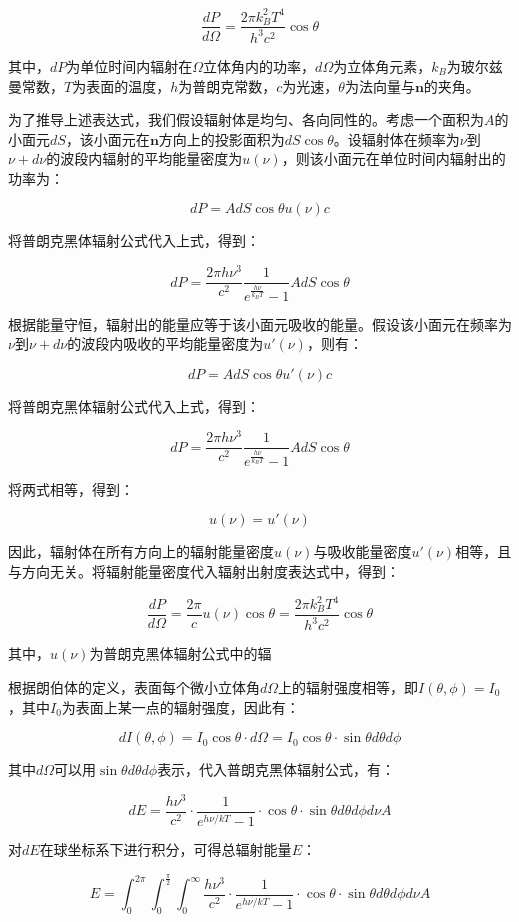 \documentclass[12pt, a4paper, oneside]{article}
\begin{document}
\begin{spacing}{2.0}
$$ \frac{dP}{d\Omega} = \frac{2\pi k_B^2 T^4}{h^3c^2}\cos\theta $$

其中，$dP$为单位时间内辐射在$\Omega$立体角内的功率，$d\Omega$为立体角元素，$k_B$为玻尔兹曼常数，$T$为表面的温度，$h$为普朗克常数，$c$为光速，$\theta$为法向量与$\mathbf{n}$的夹角。

为了推导上述表达式，我们假设辐射体是均匀、各向同性的。考虑一个面积为$A$的小面元$dS$，该小面元在$\mathbf{n}$方向上的投影面积为$dS\cos\theta$。设辐射体在频率为$\nu$到$\nu+d\nu$的波段内辐射的平均能量密度为$u(\nu)$，则该小面元在单位时间内辐射出的功率为：

$$ dP = A dS\cos\theta u(\nu) c $$

将普朗克黑体辐射公式代入上式，得到：

$$ dP = \frac{2\pi h\nu^3}{c^2}\frac{1}{e^{\frac{h\nu}{k_BT}}-1}A dS\cos\theta $$

根据能量守恒，辐射出的能量应等于该小面元吸收的能量。假设该小面元在频率为$\nu$到$\nu+d\nu$的波段内吸收的平均能量密度为$u'(\nu)$，则有：

$$ dP = A dS\cos\theta u'(\nu) c $$

将普朗克黑体辐射公式代入上式，得到：

$$ dP = \frac{2\pi h\nu^3}{c^2}\frac{1}{e^{\frac{h\nu}{k_BT}}-1}A dS\cos\theta $$

将两式相等，得到：

$$ u(\nu) = u'(\nu) $$

因此，辐射体在所有方向上的辐射能量密度$u(\nu)$与吸收能量密度$u'(\nu)$相等，且与方向无关。将辐射能量密度代入辐射出射度表达式中，得到：

$$ \frac{dP}{d\Omega} = \frac{2\pi}{c}u(\nu)\cos\theta = \frac{2\pi k_B^2 T^4}{h^3c^2}\cos\theta $$

其中，$u(\nu)$为普朗克黑体辐射公式中的辐

根据朗伯体的定义，表面每个微小立体角$d\Omega$上的辐射强度相等，即$I(\theta,\phi)=I_0$，其中$I_0$为表面上某一点的辐射强度，因此有：

$$dI(\theta,\phi)=I_0 \cos\theta \cdot d\Omega=I_0 \cos\theta \cdot \sin\theta d\theta d\phi$$

其中$d\Omega$可以用$\sin\theta d\theta d\phi$表示，代入普朗克黑体辐射公式，有：

$$dE=\frac{h\nu^3}{c^2} \cdot \frac{1}{e^{h\nu/kT}-1} \cdot \cos\theta \cdot \sin\theta d\theta d\phi d\nu A$$

对$dE$在球坐标系下进行积分，可得总辐射能量$E$：

$$E=\int_0^{2\pi}\int_0^{\frac{\pi}{2}}\int_0^{\infty}\frac{h\nu^3}{c^2} \cdot \frac{1}{e^{h\nu/kT}-1} \cdot \cos\theta \cdot \sin\theta d\theta d\phi d\nu A$$


\end{spacing}
\end{document}

